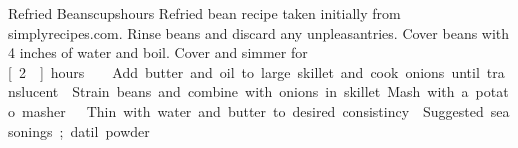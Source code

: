 \begin{recipe}{Refried Beans}{\unit[4]{cups}}{\unit[3]{hours}}
\freeform Refried bean recipe taken initially from simplyrecipes.com.
Rinse beans and discard any unpleasantries.  Cover beans with 4 inches
of water and boil.  Cover and simmer for \unit[2]{hours}.
Add butter and oil to large skillet and cook onions until translucent.
\newstep Strain beans and combine with onions in skillet.  Mash with a potato masher.
Thin with water and butter to desired consistincy.
  Suggested seasonings; datil powder
\end{recipe}
